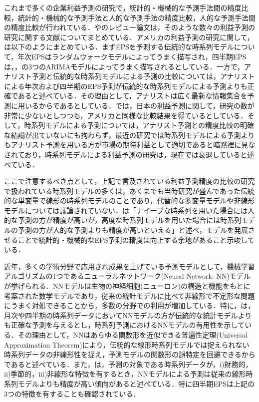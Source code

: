\documentclass[a4paper，12pt]{jsarticle}
\begin{document}
これまで多くの企業利益予測の研究で，統計的・機械的な予測手法間の精度比較，統計的・機械的な予測手法と人的な予測手法の精度比較，人的な予測手法間の精度比較が行われている．\cite{sakurai1990}や\cite{ota2006}のレビュー論文は，そのような数々の利益予測の研究に関する文献についてまとめている．アメリカの利益予測の研究に関して，\cite{sakurai1990}は以下のようにまとめている．まずEPSを予測する伝統的な時系列モデルについて，年次EPSはランダムウォークモデルによってうまく描写され，四半期EPSは\cite*{brown1979univariate}，\cite{griffin1977time}，\cite{foster1977quarterly}の3つのARIMAモデルによってうまく描写されるとしている．一方で，アナリスト予測と伝統的な時系列モデルによる予測の比較については，アナリストによる年次および四半期のEPS予測が伝統的な時系列モデルによる予測よりも正確であると述べている．その理由として，アナリストは広く最新な情報集合を予測に用いるからであるとしている．\cite{ota2006}では，日本の利益予測に関して，研究の数が非常に少ないとしつつも，アメリカと同様な比較結果を得ているとしている．そして，時系列モデルによる予測については，アナリスト予測との精度比較の明確な結論が出ていないにも拘わらず，最近の研究では時系列モデルによる予測よりもアナリスト予測を用いる方が市場の期待利益として適切であると暗黙裡に見なされており，時系列モデルによる利益予測の研究は，現在では衰退していると述べている．

ここで注意するべき点として，上記で言及されている利益予測精度の比較の研究で扱われている時系列モデルの多くは，あくまでも当時研究が盛んであった伝統的な単変量で線形の時系列モデルのことであり，代替的な多変量モデルや非線形モデルについては議論されていない．\cite{ota2006}は「ナイーブな時系列を用いた場合には人的な予測の方が精度が高いが，高度な時系列モデルを用いた場合には時系列モデルの予測の方が人的な予測よりも精度が高いといえる」と述べ，モデルを発展させることで統計的・機械的なEPS予測の精度は向上する余地があること示唆している．

近年，多くの学術分野で応用され成果を上げている予測モデルとして，機械学習アルゴリズムの1つであるニューラルネットワーク(Neural Network: NN)モデルが挙げられる．NNモデルは生物の神経細胞(ニューロン)の構造と機能をもとに考案された数学モデルであり，従来の統計モデルに比べて非線形で不定形な問題にうまく対処できることから，多数の分野での利用が増加している\citep*{tkavc2016artificial}．特に，\cite{hill1996neural}は，月次や四半期の時系列データにおいてNNモデルの方が伝統的な統計モデルよりも正確な予測を与えるとし，時系列予測におけるNNモデルの有用性を示している．その理由として，NNはあらゆる関数形を近似できる普遍性定理(Universal Approximation Theorem)\citep{hornik1989multilayer}により，伝統的な線形時系列モデルでは捉えられない時系列データの非線形性を捉え，予測モデルの関数形の誤特定を回避できるからであると述べている．また，\cite{hill1994artificial}は，予測の対象である時系列データが，i)財務的，ii)季節的，iii)非線形な特徴を有するとき，NNモデルによる予測は従来の線形時系列モデルよりも精度が高い傾向があると述べている．特に四半期EPSは上記の3つの特徴を有することも確認されている\citep*{hopwood1986univariate}．
\end{document}
